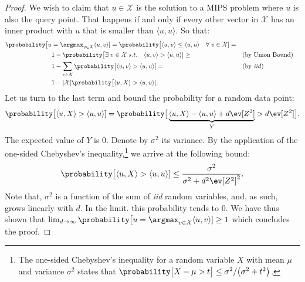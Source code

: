 \begin{proof}
    We wish to claim that $u \in \mathcal{X}$ is the solution to a MIPS problem where $u$ is also the query point.
    That happens if and only if every other vector in $\mathcal{X}$ has an inner product with $u$ that is smaller than
    $\langle u, u\rangle$. So that:
    \begin{align*}
        \probability\big[ u &= \argmax_{v \in \mathcal{X}}  \langle u, v \rangle ] =
            \probability\big[ \langle u, v \rangle \leq \langle u, u \rangle \quad \forall \; v \in \mathcal{X} ] = \\
            &1 - \probability\big[ \exists \; v \in \mathcal{X} \; \mathit{s.t.} \quad \langle u, v \rangle > \langle u, u \rangle] \geq && \text{(by Union Bound)} \\
            &1 - \sum_{v \in \mathcal{X}} \probability\big[ \langle u, v \rangle > \langle u, u \rangle] = && \text{(by \emph{iid})} \\
            &1 - \lvert \mathcal{X} \rvert \probability\big[ \langle u, X \rangle > \langle u, u \rangle].
    \end{align*}
    Let us turn to the last term and bound the probability for a random data point:
    \begin{equation*}
        \probability\big[\langle u, X \rangle > \langle u, u \rangle] =
        \probability\big[ \underbrace{\langle u, X \rangle - \langle u, u \rangle + d \ev[Z^2]}_{Y} > d \ev[Z^2] \big].
    \end{equation*}
    The expected value of $Y$ is $0$. Denote by $\sigma^2$ its variance. By the application of the one-sided
    Chebyshev's inequality,\footnote{The one-sided Chebyshev's inequality for a random variable $X$ with
    mean $\mu$ and variance $\sigma^2$ states that $\probability\big[ X - \mu > t\big] \leq \sigma^2 / \big( \sigma^2 + t^2 \big)$.}
    we arrive at the following bound:
    \begin{equation*}
        \probability\big[\langle u, X \rangle > \langle u, u \rangle] \leq \frac{\sigma^2}{\sigma^2 + d^2 \ev[Z^2]^2}.
    \end{equation*}
    Note that, $\sigma^2$ is a function of the sum of \emph{iid} random variables, and, as such, grows linearly with $d$.
    In the limit. this probability tends to $0$. We have thus shown that
    $\lim_{d \rightarrow \infty} \probability\big[ u = \argmax_{v \in \mathcal{X}}  \langle u, v \rangle ] \geq 1$ which concludes
    the proof.
\end{proof}

